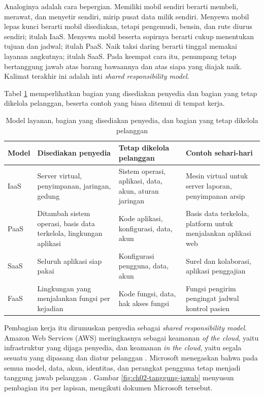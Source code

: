 Analoginya adalah cara bepergian. Memiliki mobil sendiri berarti membeli, merawat, dan
menyetir sendiri, mirip pusat data milik sendiri. Menyewa mobil lepas kunci berarti mobil
disediakan, tetapi pengemudi, bensin, dan rute diurus sendiri; itulah IaaS. Menyewa mobil
beserta sopirnya berarti cukup menentukan tujuan dan jadwal; itulah PaaS. Naik taksi daring
berarti tinggal memakai layanan angkutnya; itulah SaaS. Pada keempat cara itu, penumpang
tetap bertanggung jawab atas barang bawaannya dan atas siapa yang diajak naik. Kalimat
terakhir ini adalah inti \textit{shared responsibility model}.

Tabel \ref{tab:ch02-contoh-layanan} memperlihatkan bagian yang disediakan penyedia dan
bagian yang tetap dikelola pelanggan, beserta contoh yang biasa ditemui di tempat kerja.

\begin{table}[!htb]
  \centering
  \caption{Model layanan, bagian yang disediakan penyedia, dan bagian yang tetap dikelola
           pelanggan}
  \label{tab:ch02-contoh-layanan}
  \small
  \begin{tabularx}{\textwidth}{>{\raggedright\arraybackslash}p{1.2cm}
      >{\raggedright\arraybackslash}X >{\raggedright\arraybackslash}X
      >{\raggedright\arraybackslash}X}
    \hline
    \textbf{Model} & \textbf{Disediakan penyedia} & \textbf{Tetap dikelola pelanggan} &
      \textbf{Contoh sehari-hari} \\
    \hline
    IaaS & Server virtual, penyimpanan, jaringan, gedung & Sistem operasi, aplikasi, data,
      akun, aturan jaringan & Mesin virtual untuk server laporan, penyimpanan arsip \\
    \hline
    PaaS & Ditambah sistem operasi, basis data terkelola, lingkungan aplikasi & Kode
      aplikasi, konfigurasi, data, akun & Basis data terkelola, platform untuk menjalankan
      aplikasi web \\
    \hline
    SaaS & Seluruh aplikasi siap pakai & Konfigurasi pengguna, data, akun & Surel dan
      kolaborasi, aplikasi penggajian \\
    \hline
    FaaS & Lingkungan yang menjalankan fungsi per kejadian & Kode fungsi, data, hak akses
      fungsi & Fungsi pengirim pengingat jadwal kontrol pasien \\
    \hline
  \end{tabularx}
\end{table}

Pembagian kerja itu dirumuskan penyedia sebagai \textit{shared responsibility model}.
Amazon Web Services (AWS) meringkasnya sebagai keamanan \textit{of the cloud}, yaitu
infrastruktur yang dijaga penyedia, dan keamanan \textit{in the cloud}, yaitu segala sesuatu
yang dipasang dan diatur pelanggan \cite{c02-aws-shared}. Microsoft menegaskan bahwa pada
semua model, data, akun, identitas, dan perangkat pengguna tetap menjadi tanggung jawab
pelanggan \cite{c02-azure-shared}. Gambar \ref{fig:ch02-tanggung-jawab} menyusun pembagian
itu per lapisan, mengikuti dokumen Microsoft tersebut.

